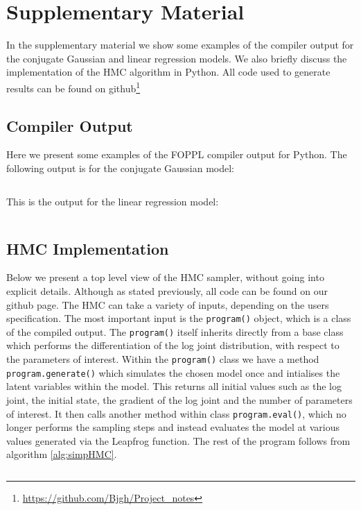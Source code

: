 \documentclass[twoside]{article}
\begin{document}
\section{Supplementary Material}
\label{sec:supmat}

In the supplementary material we show some examples of the compiler output for the conjugate Gaussian and linear regression models. We also briefly discuss the implementation of the HMC algorithm in Python.  All code used to generate results can be found on github\footnote{\url{https://github.com/Bjgh/Project_notes}}\\

\subsection{Compiler Output}
Here we present some examples of the FOPPL compiler output for Python. 
The following output is for the conjugate Gaussian model:  
\inputminted{python}{code/cjgauss.py}
This is the output for the linear regression model:
\inputminted{python}{code/lr_out.py}

\subsection{HMC Implementation}

Below we present a top level view of the HMC sampler, without going into explicit details. Although as stated previously, all code can be found on our github page. The HMC can take a variety of inputs, depending on the users specification. The most important input is the \texttt{program()} object, which is a class of the compiled output. The \texttt{program()} itself inherits directly from a base class which performs the differentiation of the log joint distribution, with respect to the parameters of interest. Within the \texttt{program()} class we have a method \texttt{program.generate()} which simulates the chosen model once and intialises the latent variables within the model. This returns all initial values such as the log joint, the initial state, the gradient of the log joint and the number of parameters of interest. It then calls another method within class \texttt{program.eval()}, which no longer performs the sampling steps and instead evaluates the model at various values generated via the Leapfrog function. The rest of the program follows from algorithm \ref{alg:simpHMC}.
 
\inputminted{python}{code/hmc_class.py}
\end{document}
